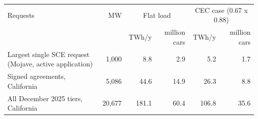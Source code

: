 \begin{tabular}{lrrrrr}
\toprule
Requests & MW & \multicolumn{2}{c}{Flat load} & \multicolumn{2}{c}{CEC case (0.67 x 0.88)} \\
 & & TWh/y & million cars & TWh/y & million cars \\
\midrule
Largest single SCE request (Mojave, active application) & 1,000 & 8.8 & 2.9 & 5.2 & 1.7 \\
Signed agreements, California & 5,086 & 44.6 & 14.9 & 26.3 & 8.8 \\
All December 2025 tiers, California & 20,677 & 181.1 & 60.4 & 106.8 & 35.6 \\
\bottomrule
\end{tabular}